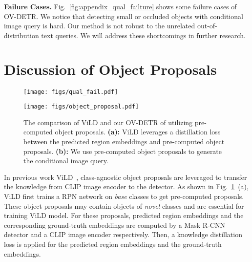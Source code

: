 \documentclass[runningheads]{llncs}
\newcommand{\methodname}{OV-DETR\xspace}
\begin{document}
\noindent \textbf{Failure Cases.}
Fig.~\ref{fig:appendix_qual_failture} shows some failure cases of \methodname.
We notice that detecting small or occluded objects with conditional image query is hard.
Our method is not robust to the unrelated out-of-distribution text queries.
We will address these shortcomings in further research.




\section{Discussion of Object Proposals}


\begin{figure}[t]
\begin{minipage}{1.0 \linewidth}
\texttt{[image: figs/qual\_fail.pdf]}
   \caption{
   \textbf{Failure cases of \methodname.}
   These images are collected from the web. We use the model trained on LVIS dataset to check the matchability with the given conditional image or text queries.
   \textbf{(a):} \methodname fails to detect these small and occluded objects with the conditional image query~(``bicycle''). But as shown in \textbf{(b)}, this issue can be solved to some extent by using text query.
   \textbf{(c):} Given the unrelated text queries~(\eg, ``philosophy''), \methodname will predict wrong false-positive detection results.
   \newline
   }
   \label{fig:appendix_qual_failture}
\end{minipage}
\begin{minipage}{1.0 \linewidth}
\centering
   \texttt{[image: figs/object\_proposal.pdf]}
   \caption{
   The comparison of ViLD and our \methodname of utilizing pre-computed object proposals.
   \textbf{(a):} ViLD leverages a distillation loss between the predicted region embeddings and pre-computed object proposals.
   \textbf{(b):} We use pre-computed object proposals to generate the conditional image query.
}
   \label{fig:appendix_proposal}
\end{minipage}
\end{figure}

In previous work ViLD~\cite{gu2021open}, class-agnostic object proposals are leveraged to transfer the knowledge from CLIP image encoder to the detector.
As shown in Fig.~\ref{fig:appendix_proposal}~(a), ViLD first trains a RPN network on \emph{base} classes to get  pre-computed proposals. These object proposals may contain objects of \emph{novel} classes and are essential for training ViLD model. For these  proposals,  predicted region embeddings and the corresponding ground-truth embeddings are computed by a Mask R-CNN detector and a CLIP image encoder respectively.
Then, a knowledge distillation loss is applied for the predicted region embeddings and the ground-truth embeddings.
\end{document}

